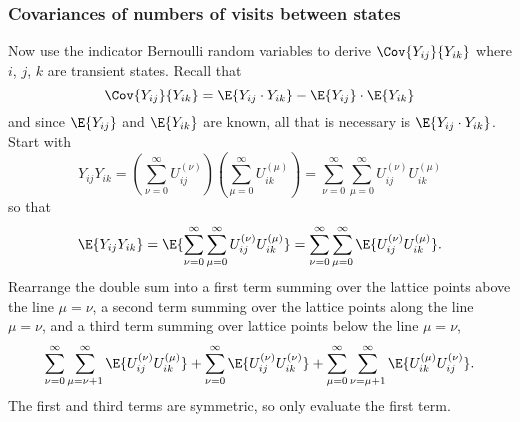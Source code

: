\documentclass[12pt]{article}
\begin{document}
\subsubsection*{Covariances of numbers of visits between states }

Now use the indicator Bernoulli random variables to derive \( \Cov{ Y_{ij}
}{ Y_{ik} } \) where \( i \), \( j \), \( k \) are transient states.
Recall that
\[
    \Cov{ Y_{ij} }{ Y_{ik} } = \E{Y_{ij} \cdot Y_{ik}} - \E{Y_{ij}}
    \cdot \E{Y_{ik}}
\] and since \( \E{Y_{ij}} \) and \( \E{Y_{ik}} \) are known, all that
is necessary is \( \E{Y_{ij} \cdot Y_{ik}} \).  Start with
\[
    Y_{ij} Y_{ik} = \left( \sum\limits_{\nu=0}^{\infty} U_{ij}^{(\nu)}
    \right) \left( \sum\limits_{\mu=0}^{\infty} U_{ik}^{(\mu)} \right) =
    \sum\limits_{\nu=0}^{\infty} \sum\limits_{\mu=0}^{\infty} U_{ij}^{(\nu)} U_
    {ik}^{(\mu)}
\] so that
\[
    \E{Y_{ij} Y_{ik}} = \E{\sum\limits_{\nu=0}^{\infty} \sum\limits_{\mu=0}^
    {\infty} U_{ij}^{(\nu)} U_{ik}^{(\mu)}} = \sum\limits_{\nu=0}^{\infty}
    \sum\limits_{\mu=0}^{\infty} \E{U_{ij}^{(\nu)} U_{ik}^{(\mu)}}.
\] Rearrange the double sum into a first term summing over the lattice
points above the line \( \mu=\nu \), a second term summing over the lattice
points along the line \( \mu=\nu \), and a third term summing over lattice
points below the line \( \mu=\nu \),
\[
    \sum\limits_{\nu=0}^{\infty} \sum\limits_{\mu=\nu+1}^{\infty} \E{U_{ij}^{(\nu)}
    U_{ik}^{(\mu)}} + \sum\limits_{\nu=0}^{\infty} \E{U_{ij}^{(\nu)} U_{ik}^{(\nu)}}
    + \sum\limits_{\mu=0}^{\infty} \sum\limits_{\nu=\mu+1}^{\infty} \E{U_{ik}^
    {(\mu)} U_{ij}^{(\nu)}}.
\] The first and third terms are symmetric, so only evaluate the first
term.
\end{document}

